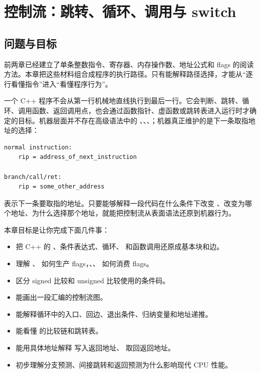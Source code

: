 \chapter{控制流：跳转、循环、调用与 switch}

\section{问题与目标}

前两章已经建立了单条整数指令、寄存器、内存操作数、地址公式和 flags 的阅读方法。本章把这些材料组合成程序的执行路径。只有能解释路径选择，才能从“逐行看懂指令”进入“看懂程序行为”。

一个 C++ 程序不会从第一行机械地直线执行到最后一行。它会判断、跳转、循环、调用函数、返回调用点，也会通过函数指针、虚函数或跳转表进入运行时才确定的目标。机器层面并不存在高级语法中的 、、、；机器真正维护的是下一条取指地址的选择：

\begin{lstlisting}
normal instruction:
    rip = address_of_next_instruction

branch/call/ret:
    rip = some_other_address
\end{lstlisting}

 表示下一条要取指的地址。只要能够解释一段代码在什么条件下改变 、改变为哪个地址、为什么选择那个地址，就能把控制流从表面语法还原到机器行为。

本章目标是让你完成下面几件事：

\begin{itemize}
  \item 把 C++ 的 、条件表达式、循环、 和函数调用还原成基本块和边。
  \item 理解 、 如何生产 flags，、、 如何消费 flags。
  \item 区分 signed 比较和 unsigned 比较使用的条件码。
  \item 能画出一段汇编的控制流图。
  \item 能解释循环中的入口、回边、退出条件、归纳变量和地址递推。
  \item 能看懂  的比较链和跳转表。
  \item 能用具体地址解释  写入返回地址、 取回返回地址。
  \item 初步理解分支预测、间接跳转和返回预测为什么影响现代 CPU 性能。
\end{itemize}

